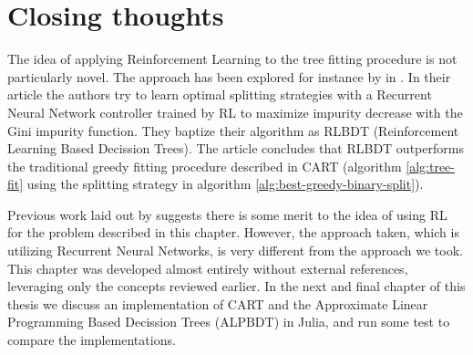 \section{Closing thoughts}

The idea of applying Reinforcement Learning to the tree fitting procedure is not
particularly novel. The approach has been explored for instance by
\citeauthor{xiong} in \cite{xiong}. In their article the authors try to learn
optimal splitting strategies with a Recurrent Neural Network controller trained
by RL to maximize impurity decrease with the Gini impurity function. They
baptize their algorithm as RLBDT (Reinforcement Learning Based Decission Trees).
The article concludes that RLBDT outperforms the traditional greedy fitting
procedure described in CART (algorithm \ref{alg:tree-fit} using the splitting
strategy in algorithm \ref{alg:best-greedy-binary-split}).

Previous work laid out by \citeauthor{xiong} suggests there is some merit to the
idea of using RL for the problem described in this chapter. However, the
approach taken, which is utilizing Recurrent Neural Networks, is very different
from the approach we took. This chapter was developed almost entirely without
external references, leveraging only the concepts reviewed earlier. In the next
and final chapter of this thesis we discuss an implementation of CART and the
Approximate Linear Programming Based Decission Trees (ALPBDT) in Julia, and run
some test to compare the implementations.